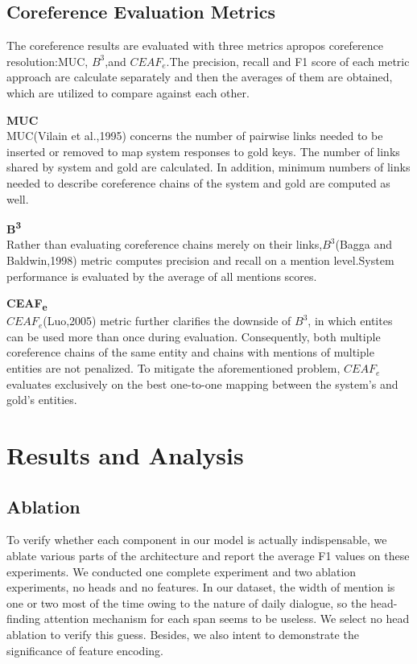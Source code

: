 \documentclass[11pt]{article}
\begin{document}
\subsection{Coreference Evaluation Metrics}
The coreference results are evaluated with three metrics apropos coreference resolution:MUC, $B^{3}$,and $CEAF_e$.The precision, recall and F1 score of each metric approach are calculate separately and then the averages of them are obtained, which are utilized to compare against each other.

\textbf{MUC}\\
MUC(Vilain et al.,1995) concerns the number of pairwise links needed to be inserted or removed to map system responses to gold keys. The number of links shared by  system and gold are calculated. In addition, minimum numbers of links needed to describe coreference chains of the system and gold are computed as well.

\textbf{B\textsuperscript{3}} \\
Rather than evaluating coreference chains merely on their links,$B^{3}$(Bagga and Baldwin,1998) metric computes precision and recall on a mention level.System performance is evaluated by the average of all mentions scores.


\textbf{CEAF\textsubscript{e}} \\
$CEAF_e$(Luo,2005) metric further clarifies the downside of $B^{3}$, in which entites can be used more than once during evaluation. Consequently, both multiple coreference chains of the same entity and chains with mentions of multiple entities are not penalized. To mitigate the aforementioned problem, $CEAF_e$ evaluates exclusively on the best one-to-one mapping between the system’s and gold’s entities.

\section{Results and Analysis}
\subsection{Ablation}
To verify whether each component in our model is actually indispensable, we ablate various parts of the architecture and report the average F1 values on these experiments. We conducted one complete experiment and two ablation experiments, no heads and no features. In our dataset, the width of mention is one or two most of the time owing to the nature of daily dialogue, so the head-finding attention mechanism for each span seems to be useless. We select no head ablation to verify this guess. Besides, we also intent to demonstrate the significance of feature encoding.
\end{document}
